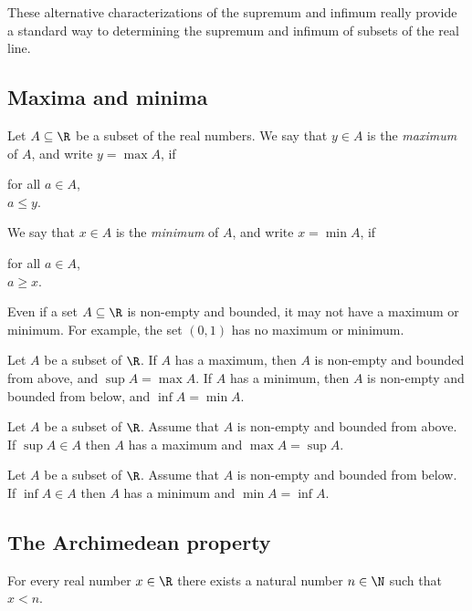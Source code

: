 These alternative characterizations of the supremum and infimum really provide a standard way to determining the supremum and infimum of subsets of the real line.

\subsection{Maxima and minima}
\begin{definition}
    Let $A \subseteq \R$ be a subset of the real numbers. We say that $y \in A$ is the \emph{maximum} of $A$, and write $y = \max A$, if 
    \begin{center}
        for all $a \in A$, \\
        $a \le y$.
    \end{center}

    We say that $x \in A$ is the \emph{minimum} of $A$, and write $x = \min A$, if
    \begin{center}
        for all $a \in A$, \\
        $a \ge x$.
    \end{center}
\end{definition}

\begin{remark}
    Even if a set $A \subseteq \R$ is non-empty and bounded, it may not have a maximum or minimum. For example, the set $(0, 1)$ has no maximum or minimum.
\end{remark}

\begin{proposition}
    Let $A$ be a subset of $\R$. If $A$ has a maximum, then $A$ is non-empty and bounded from above, and $\sup A = \max A$. If $A$ has a minimum, then $A$ is non-empty and bounded from below, and $\inf A = \min A$.
\end{proposition}

\begin{proposition}
    Let $A$ be a subset of $\R$. Assume that $A$ is non-empty and bounded from above. If $\sup A \in A$ then $A$ has a maximum and $\max A = \sup A$.
\end{proposition}

\begin{proposition}
    Let $A$ be a subset of $\R$. Assume that $A$ is non-empty and bounded from below. If $\inf A \in A$ then $A$ has a minimum and $\min A = \inf A$.
\end{proposition}

\subsection{The Archimedean property}
\begin{proposition}
    For every real number $x \in \R$ there exists a natural number $n \in \N$ such that $x < n$.
\end{proposition}

